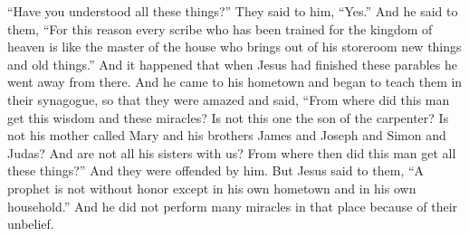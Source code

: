 \begin{biblechapter}
\verse “Have you understood all these things?” They said to him, “Yes.”
\verse And he said to them, “For this reason every scribe who has been trained for the kingdom of heaven is like the master of the house who brings out of his storeroom new things and old things.”
 And it happened that when Jesus had finished these parables he went away from there.
\verse And he came to his hometown and began to teach them in their synagogue, so that they were amazed and said, “From where did this man get this wisdom and these miracles?
\verse Is not this one the son of the carpenter? Is not his mother called Mary and his brothers James and Joseph and Simon and Judas?
\verse And are not all his sisters with us? From where then did this man get all these things?”
\verse And they were offended by him. But Jesus said to them, “A prophet is not without honor except in his own hometown and in his own household.”
\verse And he did not perform many miracles in that place because of their unbelief.
\end{biblechapter}

